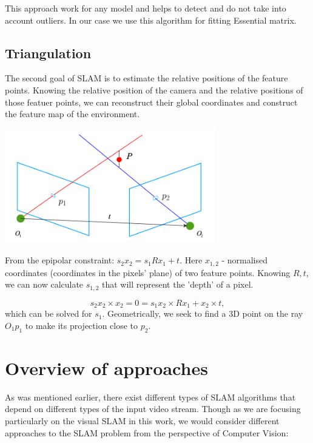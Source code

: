 This approach work for any model and helps to detect and do not take into account outliers. In our case we use this algorithm for fitting Essential matrix.

\subsection{Triangulation}

The second goal of SLAM is to estimate the relative positions of the feature points. Knowing the relative position of the camera and the relative positions of those featuer points, we can reconstruct their global coordinates and construct the feature map of the environment. 

\begin{center}
    \includegraphics[height=5cm]{triangulation.png}\\[1cm]
\end{center}

From the epipolar constraint: $s_{2} x_{2} = s_{1} R x_{1} + t$. Here $x_{1, 2}$ - normalised coordinates (coordinates in the pixels' plane) of two feature points. Knowing $R, t$, we can now calculate $s_{1, 2}$ that will represent the 'depth' of a pixel. 

\begin{equation}
    s_{2} x_{2} \times x_{2} = 0 = s_{1} x_{2} \times R x_{1} + x_{2} \times t,
\end{equation}
which can be solved for $s_{1}$. Geometrically, we seek to find a 3D point on the ray $O_{1}p_{1}$ to make its projection close to $p_{2}$.

\section{Overview of approaches}
As was mentioned earlier, there exist different types of SLAM algorithms that depend on different types of the input video stream. Though as we are focusing particularly on the visual SLAM in this work, we would consider different approaches to the SLAM problem from the perspective of Computer Vision:

